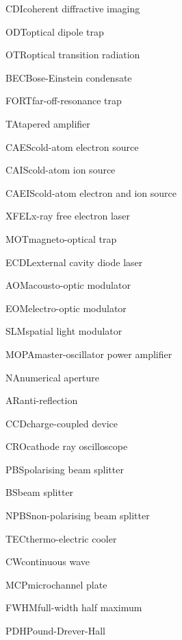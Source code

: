     {CDI}{coherent diffractive imaging}

    {ODT}{optical dipole trap}

    {OTR}{optical transition radiation}
    
    {BEC}{Bose-Einstein condensate}

    {FORT}{far-off-resonance trap}

    {TA}{tapered amplifier}

    {CAES}{cold-atom electron source}

    {CAIS}{cold-atom ion source}

    {CAEIS}{cold-atom electron and ion source}

    {XFEL}{x-ray free electron laser}

    {MOT}{magneto-optical trap}

    {ECDL}{external cavity diode laser}

    {AOM}{acousto-optic modulator}

    {EOM}{electro-optic modulator}

    {SLM}{spatial light modulator}

    {MOPA}{master-oscillator power amplifier}

    {NA}{numerical aperture}

    {AR}{anti-reflection}

    {CCD}{charge-coupled device}

    {CRO}{cathode ray oscilloscope}

    {PBS}{polarising beam splitter}

    {BS}{beam splitter}

    {NPBS}{non-polarising beam splitter}

    {TEC}{thermo-electric cooler}

    {CW}{continuous wave}

    {MCP}{microchannel plate}

    {FWHM}{full-width half maximum}

    {PDH}{Pound-Drever-Hall}
    
